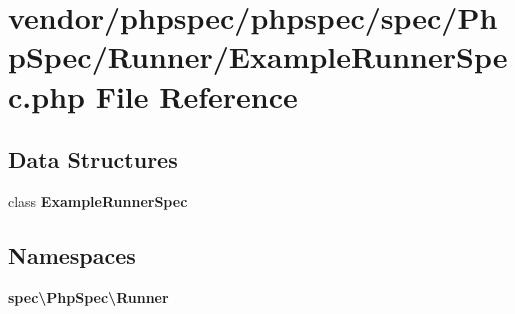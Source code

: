 \section{vendor/phpspec/phpspec/spec/\+Php\+Spec/\+Runner/\+Example\+Runner\+Spec.php File Reference}
\label{_example_runner_spec_8php}
\subsection*{Data Structures}
\begin{DoxyCompactItemize}
\item 
class {\bf Example\+Runner\+Spec}
\end{DoxyCompactItemize}
\subsection*{Namespaces}
\begin{DoxyCompactItemize}
\item 
 {\bf spec\textbackslash{}\+Php\+Spec\textbackslash{}\+Runner}
\end{DoxyCompactItemize}
